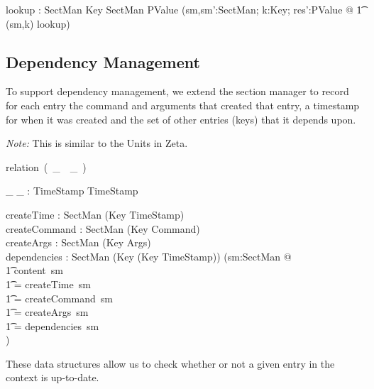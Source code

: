 \documentclass{llncs} %
\newcommand{\relation}{\mbox{relation }}
\newcommand{\varg}{~\_~}
\begin{document}
\begin{axdef}
  lookup : SectMan \cross Key \rel SectMan \cross PValue
\where
  (\forall sm,sm':SectMan; k:Key; res':PValue @
  \t1  (sm,k) \in \dom lookup) \\
\end{axdef}


\subsection{Dependency Management} \label{sec:dependency}

To support dependency management, we extend the section
manager to record for each entry the command and arguments
that created that entry, a timestamp for when it was created
and the set of other entries (keys) that it depends upon.

\emph{Note:} This is similar to the Units in Zeta.

\begin{zed}
  [TimeStamp]
\end{zed}

\newcommand{\before}{\ll}
\begin{zed}
  \relation (\varg \before \varg)
\end{zed}

\begin{axdef}
  \_ \before \_ : TimeStamp \rel TimeStamp
\end{axdef} 

\begin{axdef}
  createTime : SectMan \fun (Key \ffun TimeStamp) \\
  createCommand  : SectMan \fun (Key \ffun Command) \\
  createArgs  : SectMan \fun (Key \ffun Args) \\
  dependencies : SectMan \fun (Key \ffun (Key \ffun TimeStamp))
\where
  (\forall sm:SectMan @ \\
  \t1  \dom content~sm \\
  \t1   = \dom createTime~sm \\
  \t1   = \dom createCommand~sm \\
  \t1   = \dom createArgs~sm \\
  \t1   = \dom dependencies~sm \\
  )
\end{axdef}

These data structures allow us to check whether or not a given entry
in the context is up-to-date.
\end{document}
